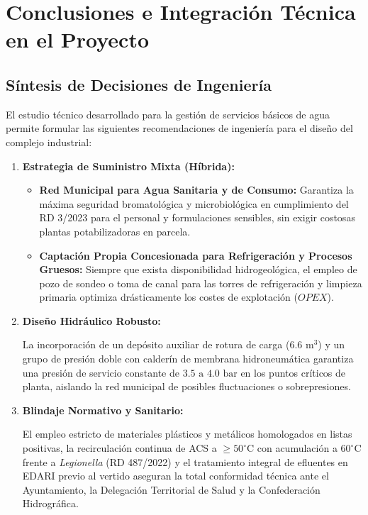 \documentclass{report}
\begin{document}

\chapter{Conclusiones e Integración Técnica en el Proyecto}



\section{Síntesis de Decisiones de Ingeniería}

El estudio técnico desarrollado para la gestión de servicios básicos de agua permite formular las siguientes recomendaciones de ingeniería para el diseño del complejo industrial:



\begin{enumerate}

    \item \textbf{Estrategia de Suministro Mixta (Híbrida):}

          \begin{itemize}

              \item \textbf{Red Municipal para Agua Sanitaria y de Consumo:} Garantiza la máxima seguridad bromatológica y microbiológica en cumplimiento del RD 3/2023 para el personal y formulaciones sensibles, sin exigir costosas plantas potabilizadoras en parcela.

              \item \textbf{Captación Propia Concesionada para Refrigeración y Procesos Gruesos:} Siempre que exista disponibilidad hidrogeológica, el empleo de pozo de sondeo o toma de canal para las torres de refrigeración y limpieza primaria optimiza drásticamente los costes de explotación ($OPEX$).

          \end{itemize}

    \item \textbf{Diseño Hidráulico Robusto:}

          La incorporación de un depósito auxiliar de rotura de carga ($6.6\text{ m}^3$) y un grupo de presión doble con calderín de membrana hidroneumática garantiza una presión de servicio constante de $3.5\text{ a }4.0\text{ bar}$ en los puntos críticos de planta, aislando la red municipal de posibles fluctuaciones o sobrepresiones.

    \item \textbf{Blindaje Normativo y Sanitario:}

          El empleo estricto de materiales plásticos y metálicos homologados en listas positivas, la recirculación continua de ACS a $\ge 50^\circ\text{C}$ con acumulación a $60^\circ\text{C}$ frente a \textit{Legionella} (RD 487/2022) y el tratamiento integral de efluentes en EDARI previo al vertido aseguran la total conformidad técnica ante el Ayuntamiento, la Delegación Territorial de Salud y la Confederación Hidrográfica.

\end{enumerate}



\newpage

\printbibliography[heading=bibintoc, title={Referencias Bibliográficas y Legislativas}]
\end{document}
